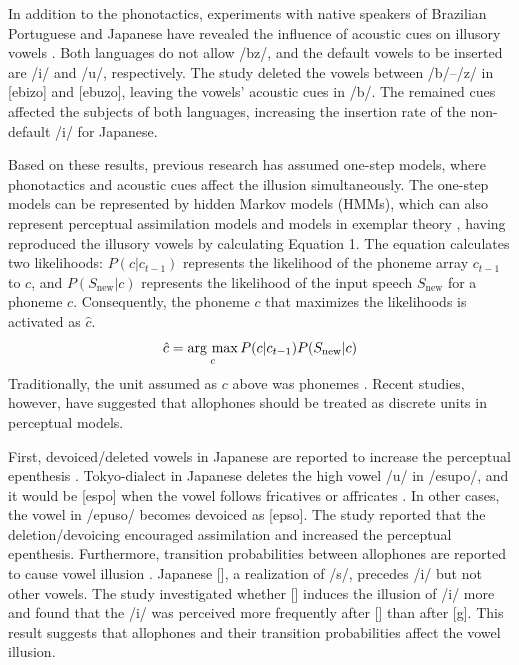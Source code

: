 \documentclass[a4paper,11pt,twocolumn]{article}
\newcommand{\argmax}{\mathop{\rm arg~max}\limits}
\begin{document}
In addition to the phonotactics, experiments with native speakers of Brazilian Portuguese and Japanese have revealed the influence of acoustic cues on illusory vowels \cite{dupoux2011illusory}. Both languages do not allow /bz/, and the default vowels to be inserted are /i/ and /u/, respectively. The study deleted the vowels between /b/--/z/ in [ebizo] and [ebuzo], leaving the vowels' acoustic cues in /b/. The remained cues affected the subjects of both languages, increasing the insertion rate of the non-default /i/ for Japanese.

Based on these results, previous research has assumed one-step models, where phonotactics and acoustic cues affect the illusion simultaneously. The one-step models can be represented by hidden Markov models (HMMs), which can also represent perceptual assimilation models \cite{best2001discrimination} and models in exemplar theory \cite{lacerda1995perceptual}, having reproduced the illusory vowels \cite{kishiyama2021influence} by calculating Equation 1. The equation calculates two likelihoods: $P(c|c_{t-1})$ represents the likelihood of the phoneme array $c_{t-1}$ to $c$, and $P(S_{\text{new}}|c)$ represents the likelihood of the input speech $S_{\text{new}}$ for a phoneme $c$. Consequently, the phoneme $c$ that maximizes the likelihoods is activated as $\hat{c}$.
\begin{equation} \label{hmm}
    \hat{c} = \argmax_{c} P(c | c_{t-1})P(S_{\text{new}}|c)
\end{equation}
Traditionally, the unit assumed as $c$ above was phonemes \cite{wilson2013bayesian}. Recent studies, however, have suggested that allophones should be treated as discrete units in perceptual models.

First, devoiced/deleted vowels in Japanese are reported to increase the perceptual epenthesis \cite{kilpatrick2018japanese}. Tokyo-dialect in Japanese deletes the high vowel /u/ in /esupo/, and it would be [espo] when the vowel follows fricatives or affricates \cite{fujimoto2003devoice_eng, shaw2018lingual}. In other cases, the vowel in /epuso/ becomes devoiced as [ep\textsubring{\textturnm}so]. The study reported that the deletion/devoicing encouraged assimilation and increased the perceptual epenthesis. Furthermore, transition probabilities between allophones are reported to cause vowel illusion \cite{kilpatrick2020japanese}. Japanese [\textctc], a realization of /s/, precedes /i/ but not other vowels. The study investigated whether [\textctc{}] induces the illusion of /i/ more \cite{kilpatrick2020japanese} and found that the /i/ was perceived more frequently after [\textctc] than after [g]. This result suggests that allophones and their transition probabilities affect the vowel illusion.
\end{document}
